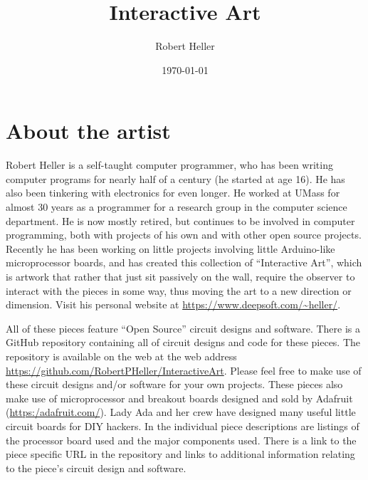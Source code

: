 \documentclass[12pt]{article}
\title{Interactive Art}
\author{Robert Heller}
\date{\today}
\begin{document}
\maketitle


\section*{About the artist}

Robert Heller is a self-taught computer programmer, who has been writing 
computer programs for nearly half of a century (he started at age 16).  He has 
also been tinkering with electronics for even longer.  He worked at UMass 
for almost 30 years as a programmer for a research group in the computer 
science department.  He is now mostly retired, but continues to be involved in 
computer programming, both with projects of his own and with other open source 
projects.  Recently he has been working on little projects involving 
little Arduino-like microprocessor boards, and has created this collection of 
``Interactive Art'', which is artwork that rather that just sit passively on 
the wall, require the observer to interact with the pieces in some way, thus 
moving the art to a new direction or dimension. Visit his personal website at 
\url{https://www.deepsoft.com/~heller/}.


All of these pieces feature ``Open Source'' circuit designs and software.
There is a GitHub repository containing all of circuit designs and code for
these pieces. The repository is available on the web at the web address
\url{https://github.com/RobertPHeller/InteractiveArt}.
Please feel free to make use of these circuit designs and/or software for your
own projects. These pieces also make use of microprocessor and breakout boards
designed and sold by Adafruit
(\url{https:/adafruit.com/}). Lady
Ada and her crew have designed many useful little circuit boards for DIY
hackers.  In the individual piece descriptions are listings of the processor 
board used and the major components used.  There is a link to the piece 
specific URL in the repository and links to additional information relating to 
the piece's circuit design and software.
\end{document}
